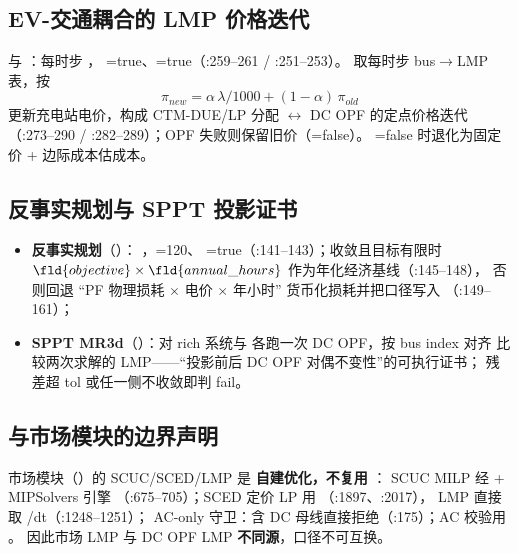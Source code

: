 \subsection{EV-交通耦合的 LMP 价格迭代}
 与
：每时步 ，
=true、=true（:259--261 / :251--253）。
取每时步 bus$\to$LMP 表，按
\[
\pi_{new}=\alpha\,\lambda/1000+(1-\alpha)\,\pi_{old}
\]
更新充电站电价，构成 CTM-DUE/LP 分配 $\leftrightarrow$ DC OPF 的定点价格迭代
（:273--290 / :282--289）；OPF 失败则保留旧价（=false）。
=false 时退化为固定价 + 边际成本估成本。

\subsection{反事实规划与 SPPT 投影证书}
\begin{itemize}
  \item \textbf{反事实规划}（）：
        ，=120、
        =true（:141--143）；收敛且目标有限时
        $\fld{objective}\times\fld{annual\_hours}$ 作为年化经济基线（:145--148），
        否则回退 ``PF 物理损耗 $\times$ 电价 $\times$ 年小时'' 货币化损耗并把口径写入
        （:149--161）；
  \item \textbf{SPPT MR3d}（）：对 rich 系统与
         各跑一次 DC OPF，按 bus index 对齐
        比较两次求解的 LMP——``投影前后 DC OPF 对偶不变性''的可执行证书；
        残差超 tol 或任一侧不收敛即判 fail。
\end{itemize}

\subsection{与市场模块的边界声明}
市场模块（）的 SCUC/SCED/LMP 是
\textbf{自建优化，不复用} ：
SCUC MILP 经  + MIPSolvers 引擎
（:675--705）；SCED 定价 LP 用
（:1897、:2017），
LMP 直接取 /dt（:1248--1251）；
AC-only 守卫：含 DC 母线直接拒绝（:175）；AC 校验用 。
因此市场 LMP 与 DC OPF LMP \textbf{不同源}，口径不可互换。

